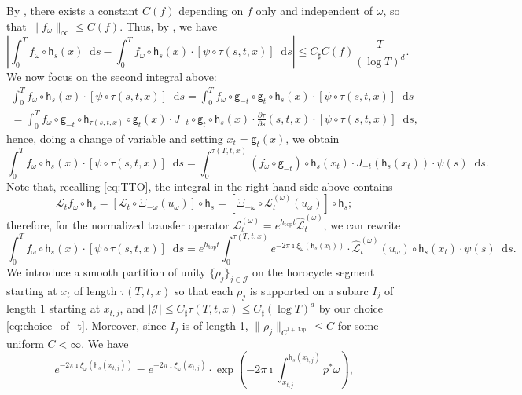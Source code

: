 \documentclass[11pt,letterpaper]{amsart}
\newcommand \cL {{\mathcal L}}
\newcommand \sC {{C_\sharp}}
\newcommand{\horo}{\mathsf{h}}
\newcommand{\geo}{\mathsf{g}}
\newcommand*{\diff}{\mathop{}\!\mathrm{d}}
\DeclareMathOperator{\topp}{top}
\theoremstyle{definition}
\begin{document}
By , there exists a constant $C(f)$ depending on $f$ only and independent of $\omega$, so that $\|f_\omega\|_{\infty} \leq C(f)$. 
Thus, by , we have
\begin{equation}\label{eq:approx_1}
\left\lvert \int_{0}^{T} f_\omega \circ \horo_s(x) \diff s - \int_{0}^{T} f_\omega \circ \horo_s(x) \cdot [\psi \circ \tau(s,t,x) ]\diff s \right\rvert \leq \sC C(f) \frac{T}{(\log T)^d}.
\end{equation}
We now focus on the second integral above:
\begin{multline*}
\int_0^T f_\omega \circ \horo_s(x) \cdot [\psi \circ \tau(s,t,x) ] \diff s = \int_0^T f_\omega \circ \geo_{-t}  \circ \geo_{t} \circ \horo_s(x)\cdot [\psi\circ \tau(s,t,x) ] \diff s \\
 = \int_0^T f_\omega \circ \geo_{-t} \circ \horo_{\tau(s,t,x)} \circ \geo_{t}(x) \cdot J_{-t} \circ \geo_{t} \circ \horo_s(x) \cdot \frac{\partial \tau}{\partial s}(s,t,x) \cdot [\psi \circ \tau(s,t,x) ] \diff s,
\end{multline*}
hence, doing a change of variable and setting $x_{t} = \geo_{t}(x)$, we obtain
\[
\int_0^T f_\omega \circ \horo_s(x) \cdot [\psi\circ \tau(s,t,x) ] \diff s = \int_{0}^{\tau(T,t,x)} (f_\omega \circ \geo_{-t})\circ \horo_s(x_t) \cdot J_{-t} (\horo_s (x_{t})) \cdot \psi(s)\diff s.
\]
Note that, recalling \eqref{eq:TTO}, the integral in the right hand side above contains
\[
\cL_{t} f_\omega \circ \horo_s = [\cL_{t} \circ \Xi_{-\omega}(u_\omega)] \circ \horo_s =  [\Xi_{-\omega} \circ \cL^{(\omega)}_{t} (u_{\omega})]\circ \horo_s;
\]
therefore, for the normalized transfer operator $\cL_{t}^{(\omega)}  = e^{h_{\topp}t} \hat{\cL}_{t}^{(\omega)} $, we can rewrite
\[
\int_0^T f_\omega \circ \horo_s(x) \cdot [\psi \circ \tau(s,t,x) ] \diff s = e^{h_{\topp}t} \int_{0}^{\tau(T,t,x)} e^{- 2 \pi \imath \xi_{\omega}(\horo_s(x_{t}))} \cdot \hat{\cL}^{(\omega)}_{t} (u_{\omega}) \circ \horo_s(x_{t}) \cdot \psi(s) \diff s.
\]
We introduce a smooth partition of unity $\{\rho_j\}_{j \in \mathcal{J}}$ on the horocycle segment starting at $x_t$ of length $\tau(T,t,x)$ so that each $\rho_j$ is supported on a subarc $I_j$ of length 1 starting at $x_{t,j}$, and $|\mathcal{J}|\leq \sC\tau(T,t,x) \leq \sC (\log T)^d$ by our choice \eqref{eq:choice_of_t}. Moreover, since $I_j$ is of length 1, $\|\rho_j\|_{C^{1+\operatorname{Lip}}}\le C$ for some uniform $C<\infty$.
We have
\[
e^{- 2 \pi \imath \xi_{\omega}(\horo_s(x_{t,j}))} = e^{- 2 \pi \imath \xi_{\omega}(x_{t,j})} \cdot \exp\left(- 2 \pi \imath \int_{x_{t,j}}^{\horo_s(x_{t,j})}p^{\ast}\omega \right),
\]
\end{document}

